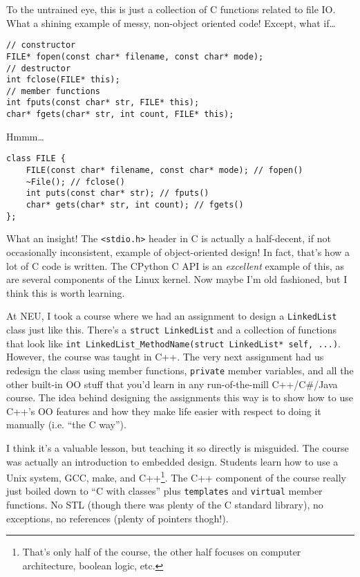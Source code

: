 \documentclass{article}
\begin{document}
To the untrained eye, this is just a collection of C functions related to file IO.  What a shining example of messy, non-object oriented code!  Except, what if\ldots
\begin{lstlisting}
// constructor 
FILE* fopen(const char* filename, const char* mode);
// destructor
int fclose(FILE* this);
// member functions
int fputs(const char* str, FILE* this);
char* fgets(char* str, int count, FILE* this);
\end{lstlisting}
Hmmm\ldots
\begin{lstlisting}
class FILE {
	FILE(const char* filename, const char* mode); // fopen()
	~File(); // fclose()
	int puts(const char* str); // fputs()
	char* gets(char* str, int count); // fgets()
};
\end{lstlisting}

What an insight!  The \lstinline{<stdio.h>} header in C is actually a half-decent, if not occasionally inconsistent, example of object-oriented design!  In fact, that's how a lot of C code is written.  The CPython C API is an \emph{excellent} example of this, as are several components of the Linux kernel.  Now maybe I'm old fashioned, but I think this is worth learning.  

At NEU, I took a course where we had an assignment to design a \lstinline{LinkedList} class just like this.  There's a \lstinline{struct LinkedList} and a collection of functions that look like \lstinline{int LinkedList_MethodName(struct LinkedList* self, ...)}.  However, the course was taught in C++.  The very next assignment had us redesign the class using member functions, \lstinline{private} member variables, and all the other built-in OO stuff that you'd learn in any run-of-the-mill C++/C\#/Java course.  The idea behind designing the assignments this way is to show how to use C++'s OO features and how they make life easier with respect to doing it manually (i.e. ``the C way'').

I think it's a valuable lesson, but teaching it so directly is misguided.  The course was actually an introduction to embedded design.  Students learn how to use a Unix system, GCC, make, and C++\footnote{That's only half of the course, the other half focuses on computer architecture, boolean logic, etc.}.  The C++ component of the course really just boiled down to ``C with classes'' plus \lstinline{templates} and \lstinline{virtual} member functions.  No STL (though there was plenty of the C standard library), no exceptions, no references (plenty of pointers thogh!).
\end{document}
